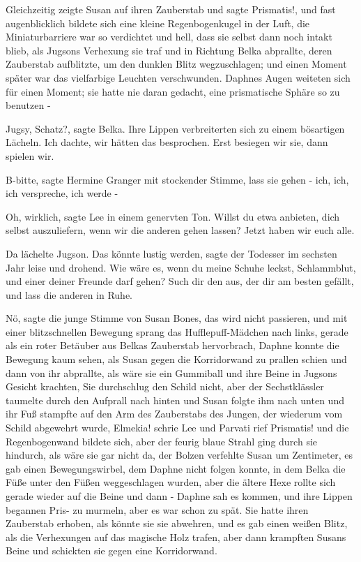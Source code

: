 Gleichzeitig zeigte Susan auf ihren Zauberstab und sagte \glqq
Prismatis!\grqq{}, und fast augenblicklich bildete sich eine kleine
Regenbogenkugel in der Luft, die Miniaturbarriere war so verdichtet und hell,
dass sie selbst dann noch intakt blieb, als Jugsons Verhexung sie traf und in
Richtung Belka abprallte, deren Zauberstab aufblitzte, um den dunklen Blitz
wegzuschlagen; und einen Moment später war das vielfarbige Leuchten
verschwunden. Daphnes Augen weiteten sich für einen Moment; sie hatte nie daran
gedacht, eine prismatische Sphäre so zu benutzen -

\glqq{}Jugsy, Schatz?\grqq{}, sagte Belka. Ihre Lippen verbreiterten sich zu
einem bösartigen Lächeln. \glqq{}Ich dachte, wir hätten das besprochen. Erst
besiegen wir sie, dann spielen wir.\grqq{}

\glqq{}B-bitte\grqq{}, sagte Hermine Granger mit stockender Stimme, \glqq{}lass
sie gehen - ich, ich, ich verspreche, ich werde -\grqq{}

\glqq{}Oh, wirklich\grqq{}, sagte Lee in einem genervten Ton. \glqq{}Willst du
etwa anbieten, dich selbst auszuliefern, wenn wir die anderen gehen lassen?
Jetzt haben wir euch alle.\grqq{}

Da lächelte Jugson. \glqq{}Das könnte lustig werden\grqq{}, sagte der Todesser im
sechsten Jahr leise und drohend. \glqq{}Wie wäre es, wenn du meine Schuhe leckst,
Schlammblut, und einer deiner Freunde darf gehen? Such dir den aus, der dir am
besten gefällt, und lass die anderen in Ruhe.\grqq{}

\glqq{}Nö\grqq{}, sagte die junge Stimme von Susan Bones, \glqq{}das wird nicht
passieren\grqq{}, und mit einer blitzschnellen Bewegung sprang das
Hufflepuff-Mädchen nach links, gerade als ein roter Betäuber aus Belkas
Zauberstab hervorbrach, Daphne konnte die Bewegung kaum sehen, als Susan gegen
die Korridorwand zu prallen schien und dann von ihr abprallte, als wäre sie ein
Gummiball und ihre Beine in Jugsons Gesicht krachten, Sie durchschlug den Schild
nicht, aber der Sechstklässler taumelte durch den Aufprall nach hinten und Susan
folgte ihm nach unten und ihr Fuß stampfte auf den Arm des Zauberstabs des
Jungen, der wiederum vom Schild abgewehrt wurde, \glqq{}Elmekia! \glqq{} schrie
Lee und Parvati rief \glqq{}Prismatis! \glqq{} und die Regenbogenwand bildete
sich, aber der feurig blaue Strahl ging durch sie hindurch, als wäre sie gar
nicht da, der Bolzen verfehlte Susan um Zentimeter, es gab einen
Bewegungswirbel, dem Daphne nicht folgen konnte, in dem Belka die Füße unter den
Füßen weggeschlagen wurden, aber die ältere Hexe rollte sich gerade wieder auf
die Beine und dann - Daphne sah es kommen, und ihre Lippen begannen \glqq
Pris-\grqq{} zu murmeln, aber es war schon zu spät. Sie hatte ihren Zauberstab
erhoben, als könnte sie sie abwehren, und es gab einen weißen Blitz, als die
Verhexungen auf das magische Holz trafen, aber dann krampften Susans Beine und
schickten sie gegen eine Korridorwand.

